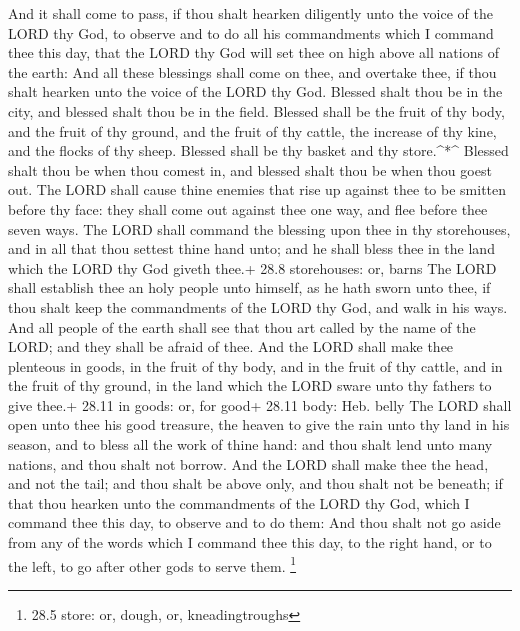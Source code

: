  And it shall come to pass, if thou shalt hearken diligently
unto the voice of the LORD thy God, to observe and to do all his
commandments which I command thee this day, that the LORD thy God will
set thee on high above all nations of the earth:  And all
these blessings shall come on thee, and overtake thee, if thou shalt
hearken unto the voice of the LORD thy God.  Blessed shalt
thou be in the city, and blessed shalt thou be in the field.
 Blessed shall be the fruit of thy body, and the fruit of
thy ground, and the fruit of thy cattle, the increase of thy kine, and
the flocks of thy sheep.  Blessed shall be thy basket and
thy store.\^{}*\^{}  Blessed shalt thou be when thou comest
in, and blessed shalt thou be when thou goest out.  The LORD
shall cause thine enemies that rise up against thee to be smitten before
thy face: they shall come out against thee one way, and flee before thee
seven ways.  The LORD shall command the blessing upon thee
in thy storehouses, and in all that thou settest thine hand unto; and he
shall bless thee in the land which the LORD thy God giveth thee.+ 28.8
storehouses: or, barns  The LORD shall establish thee an
holy people unto himself, as he hath sworn unto thee, if thou shalt keep
the commandments of the LORD thy God, and walk in his ways.
 And all people of the earth shall see that thou art called
by the name of the LORD; and they shall be afraid of thee. 
And the LORD shall make thee plenteous in goods, in the fruit of thy
body, and in the fruit of thy cattle, and in the fruit of thy ground, in
the land which the LORD sware unto thy fathers to give thee.+ 28.11 in
goods: or, for good+ 28.11 body: Heb. belly  The LORD shall
open unto thee his good treasure, the heaven to give the rain unto thy
land in his season, and to bless all the work of thine hand: and thou
shalt lend unto many nations, and thou shalt not borrow. 
And the LORD shall make thee the head, and not the tail; and thou shalt
be above only, and thou shalt not be beneath; if that thou hearken unto
the commandments of the LORD thy God, which I command thee this day, to
observe and to do them:  And thou shalt not go aside from
any of the words which I command thee this day, to the right hand, or to
the left, to go after other gods to serve them. \footnote{28.5 store:
  or, dough, or, kneadingtroughs}

